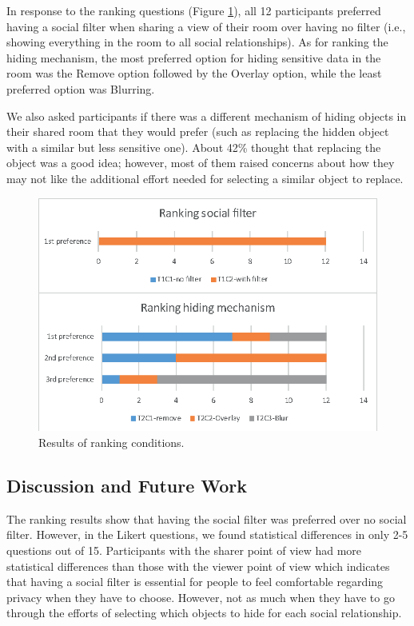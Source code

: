 In response to the ranking questions (Figure \ref{fig:frontier18:result-ranking}), all 12 participants preferred having a social filter when sharing a view of their room over having no filter (i.e., showing everything in the room to all social relationships). As for ranking the hiding mechanism, the most preferred option for hiding sensitive data in the room was the Remove option followed by the Overlay option, while the least preferred option was Blurring. 

We also asked participants if there was a different mechanism of hiding objects in their shared room that they would prefer (such as replacing the hidden object with a similar but less sensitive one). About 42\% thought that replacing the object was a good idea; however, most of them raised concerns about how they may not like the additional effort needed for selecting a similar object to replace.

\begin{figure}
\begin{center}
\includegraphics[width=0.8\linewidth]{images/frontier18/images-07.eps}
\caption{Results of ranking conditions.}\label{fig:frontier18:result-ranking}
\end{center}
\end{figure}

\subsection{Discussion and Future Work}

The ranking results show that having the social filter was preferred over no social filter. However, in the Likert questions, we found statistical differences in only 2-5 questions out of 15. Participants with the sharer point of view had more statistical differences than those with the viewer point of view which indicates that having a social filter is essential for people to feel comfortable regarding privacy when they have to choose. However, not as much when they have to go through the efforts of selecting which objects to hide for each social relationship.  

